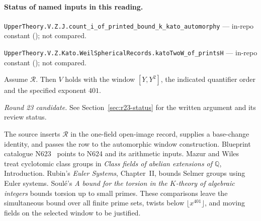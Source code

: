 

\paragraph{Status of named inputs in this reading.}
\noindent\nolinkurl{UpperTheory.V.Z.J.count_i_of_printed_bound_k_kato_automorphy} --- in-repo constant (); not compared.\par
\noindent\nolinkurl{UpperTheory.V.Z.Kato.WeilSphericalRecords.katoTwoW_of_printsH} --- in-repo constant (); not compared.\par

\begin{formalstatement}\label{pn:P013}
Assume $\mathcal R$. Then $V$ holds with the window $[Y,Y^2]$, the indicated quantifier order and the specified exponent $401$.
\end{formalstatement}
 \noindent\emph{Round 23 candidate.} See Section~\ref{sec:r23-status} for the written argument and its review status.\par
The source inserts $\mathcal R$ in the one-field open-image record, supplies a base-change identity, and passes the row to the automorphic window construction. Blueprint catalogue N623~ points to N624 and its arithmetic inputs. Mazur and Wiles~\cite{r21-mw} treat cyclotomic class groups in \emph{Class fields of abelian extensions of $\mathbb Q$}, Introduction. Rubin's \emph{Euler Systems}, Chapter~II, bounds Selmer groups using Euler systems. Soulé's \emph{A bound for the torsion in the $K$-theory of algebraic integers} bounds torsion up to small primes. These comparisons leave the simultaneous bound over all finite prime sets, twists below $\lfloor x^{401}\rfloor$, and moving fields on the selected window to be justified.

